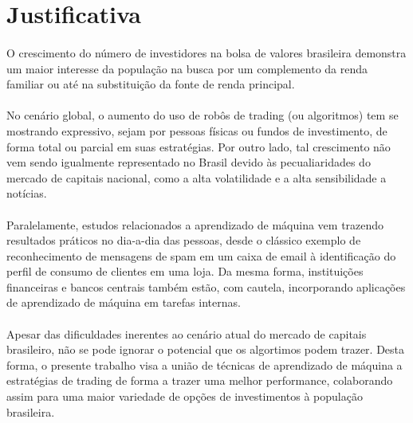 \section{Justificativa}

\paragraph{} O crescimento do número de investidores na bolsa de valores brasileira\cite{aumento_investidores} demonstra um maior interesse da população na busca por um complemento da renda familiar ou até na substituição da fonte de renda principal.

\paragraph{} No cenário global, o aumento do uso de robôs de trading (ou algoritmos) tem se mostrando expressivo\cite{robos_investidores}, sejam por pessoas físicas ou fundos de investimento, de forma total ou parcial em suas estratégias. Por outro lado, tal crescimento não vem sendo igualmente representado no Brasil devido às pecualiaridades do mercado de capitais nacional, como a alta volatilidade e a alta sensibilidade a notícias\cite{robos_e_fundos}.

\paragraph{} Paralelamente, estudos relacionados a aprendizado de máquina vem trazendo resultados práticos no dia-a-dia das pessoas, desde o clássico exemplo de reconhecimento de mensagens de spam em um caixa de email à identificação do perfil de consumo de clientes em uma loja. Da mesma forma, instituições financeiras e bancos centrais também estão, com cautela, incorporando aplicações de aprendizado de máquina em tarefas internas\cite{ml_finantial_usage}.

\paragraph{} Apesar das dificuldades inerentes ao cenário atual do mercado de capitais brasileiro, não se pode ignorar o potencial que os algortimos podem trazer. Desta forma, o presente trabalho visa a união de técnicas de aprendizado de máquina a estratégias de trading de forma a trazer uma melhor performance, colaborando assim para uma maior variedade de opções de investimentos à população brasileira.

